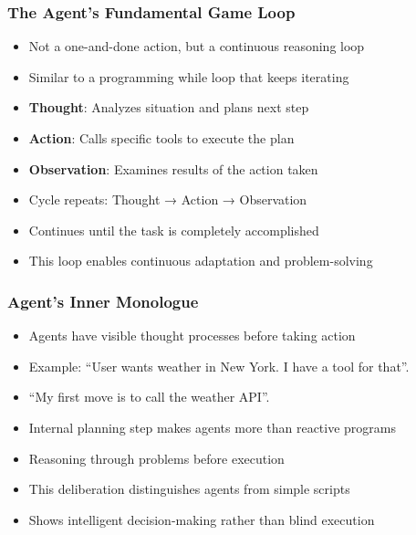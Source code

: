 \begin{frame}[fragile]\frametitle{The Agent's Fundamental Game Loop}
      \begin{itemize}
        \item Not a one-and-done action, but a continuous reasoning loop
        \item Similar to a programming while loop that keeps iterating
        \item \textbf{Thought}: Analyzes situation and plans next step
        \item \textbf{Action}: Calls specific tools to execute the plan
        \item \textbf{Observation}: Examines results of the action taken
        \item Cycle repeats: Thought → Action → Observation
        \item Continues until the task is completely accomplished
        \item This loop enables continuous adaptation and problem-solving
      \end{itemize}
\end{frame}

\begin{frame}[fragile]\frametitle{Agent's Inner Monologue}
      \begin{itemize}
        \item Agents have visible thought processes before taking action
        \item Example: ``User wants weather in New York. I have a tool for that''.
        \item ``My first move is to call the weather API''.
        \item Internal planning step makes agents more than reactive programs
        \item Reasoning through problems before execution
        \item This deliberation distinguishes agents from simple scripts
        \item Shows intelligent decision-making rather than blind execution
      \end{itemize}
\end{frame}

